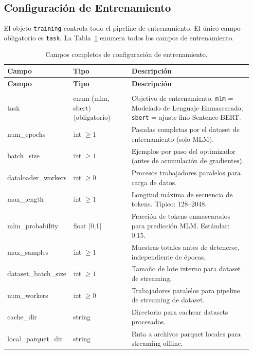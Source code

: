 \subsection{Configuración de Entrenamiento}
\label{subsec:training-config}

El objeto \texttt{training} controla todo el pipeline de entrenamiento. El único campo obligatorio es \texttt{task}. La Tabla~\ref{tab:training-fields} enumera todos los campos de entrenamiento.

\begin{longtable}{>{\ttfamily}l>{\raggedright\arraybackslash}p{3.5cm}>{\raggedright\arraybackslash}p{8.5cm}}
\toprule
\textbf{Campo} & \textbf{Tipo} & \textbf{Descripción} \\
\midrule
\endfirsthead
\toprule
\textbf{Campo} & \textbf{Tipo} & \textbf{Descripción} \\
\midrule
\endhead
\midrule
\multicolumn{3}{r}{\textit{continúa en la página siguiente}} \\
\endfoot
\bottomrule
\caption{Campos completos de configuración de entrenamiento.}
\label{tab:training-fields}
\endlastfoot
task & enum (mlm, sbert) (obligatorio) & Objetivo de entrenamiento. \texttt{mlm} = Modelado de Lenguaje Enmascarado; \texttt{sbert} = ajuste fino Sentence-BERT. \\
num\_epochs & int $\ge 1$ & Pasadas completas por el dataset de entrenamiento (solo MLM). \\
batch\_size & int $\ge 1$ & Ejemplos por paso del optimizador (antes de acumulación de gradientes). \\
dataloader\_workers & int $\ge 0$ & Procesos trabajadores paralelos para carga de datos. \\
max\_length & int $\ge 1$ & Longitud máxima de secuencia de tokens. Típico: 128--2048. \\
mlm\_probability & float [0,1] & Fracción de tokens enmascarados para predicción MLM. Estándar: 0.15. \\
max\_samples & int $\ge 1$ & Muestras totales antes de detenerse, independiente de épocas. \\
dataset\_batch\_size & int $\ge 1$ & Tamaño de lote interno para dataset de streaming. \\
num\_workers & int $\ge 0$ & Trabajadores paralelos para pipeline de streaming de dataset. \\
cache\_dir & string & Directorio para cachear datasets procesados. \\
local\_parquet\_dir & string & Ruta a archivos parquet locales para streaming offline. \\

\end{longtable}
